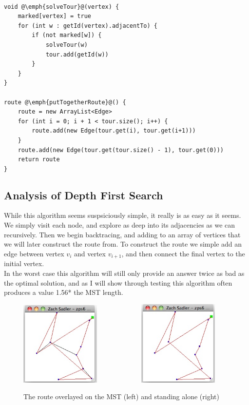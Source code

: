 \documentclass[paper=a4, fontsize=11pt]{scrartcl} %
\numberwithin{equation}{section} %
\numberwithin{figure}{section} %
\numberwithin{table}{section} %
\begin{document}
\begin{lstlisting}

void @\emph{solveTour}@(vertex) {
	marked[vertex] = true
	for (int w : getId(vertex).adjacentTo) {
		if (not marked[w]) {
			solveTour(w)
			tour.add(getId(w))
		}
	}		
}

route @\emph{putTogetherRoute}@() {
	route = new ArrayList<Edge>
	for (int i = 0; i + 1 < tour.size(); i++) {
		route.add(new Edge(tour.get(i), tour.get(i+1)))
	}
	route.add(new Edge(tour.get(tour.size() - 1), tour.get(0)))
	return route
}
\end{lstlisting}

\subsection{Analysis of Depth First Search}

While this algorithm seems suspsiciously simple, it really is as easy as it seems. We simply visit each node, and explore as deep into its adjacencies as we can recursively. Then we begin backtracing, and adding to an array of vertices that we will later construct the route from. To construct the route we simple add an edge between vertex $v_i$ and vertex $v_{i+1}$, and then connect the final vertex to the initial vertex. \\
\indent In the worst case this algorithm will still only provide an answer twice as bad as the optimal solution, and as I will show through testing this algorithm often produces a value 1.56* the MST length.
\begin{figure}[ht!]
\centering
\includegraphics[width=40mm]{Figure_7}\,\,\,\,\,\,\,\,\,\,\,\,\,\,\,\,\,\,\,\,\,\,\,\,\,\,\,\,\,\,\,\,\,\,\,\,\,
\includegraphics[width=40mm]{Figure_6}
\caption{The route overlayed on the MST (left) and standing alone (right)}
\label{overflow}
\end{figure}
\end{document}
